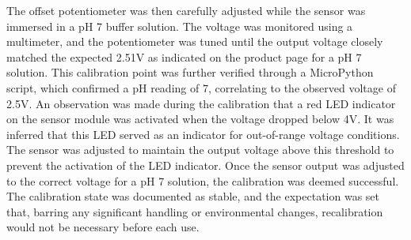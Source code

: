 \documentclass[12pt]{article}
\begin{document}
\newline
\newline
\noindent The offset potentiometer was then carefully adjusted while the sensor was immersed in a pH 7 buffer solution. The voltage was monitored using a multimeter, and the potentiometer was tuned until the output voltage closely matched the expected 2.51V as indicated on the product page for a pH 7 solution. This calibration point was further verified through a MicroPython script, which confirmed a pH reading of 7, correlating to the observed voltage of 2.5V.
\newline
\newline
\noindent An observation was made during the calibration that a red LED indicator on the sensor module was activated when the voltage dropped below 4V. It was inferred that this LED served as an indicator for out-of-range voltage conditions. The sensor was adjusted to maintain the output voltage above this threshold to prevent the activation of the LED indicator.
Once the sensor output was adjusted to the correct voltage for a pH 7 solution, the calibration was deemed successful. The calibration state was documented as stable, and the expectation was set that, barring any significant handling or environmental changes, recalibration would not be necessary before each use. 
\end{document}
